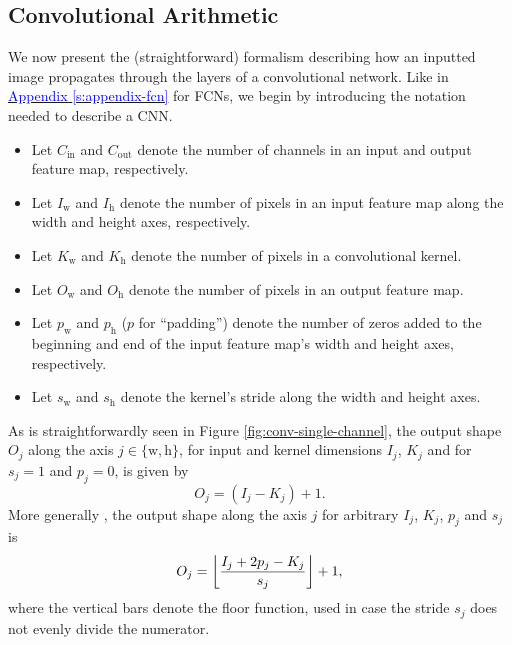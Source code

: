 \documentclass[11pt, a4paper]{article}
\newcommand{\myhref}[2]{\hyperref[#1]{\textcolor{blue}{#2}}}
\DeclarePairedDelimiter\floor{\lfloor}{\rfloor}  %
\begin{document}
\subsection{Convolutional Arithmetic} \label{ss:conv-arithmetic}
We now present the (straightforward) formalism describing how an inputted image propagates through the layers of a convolutional network. Like in \myhref{s:appendix-fcn}{Appendix \ref{s:appendix-fcn}} for FCNs, we begin by introducing the notation needed to describe a CNN.
\begin{itemize}

    \item Let $ C_{\text{in}} $ and $ C_{\text{out}} $ denote the number of channels in an input and output feature map, respectively.

    \item Let $ I_{\text{w}} $ and $ I_{\text{h}} $ denote the number of pixels in an input feature map along the width and height axes, respectively.

    \item Let $ K_{\text{w}} $ and $ K_{\text{h}} $ denote the number of pixels in a convolutional kernel. %

    \item Let $ O_{\text{w}} $ and $ O_{\text{h}} $ denote the number of pixels in an output feature map. %

    \item Let $ p_{\text{w}} $ and $ p_{\text{h}} $ ($ p $ for ``padding'') denote the number of zeros added to the beginning and end of the input feature map's width and height axes, respectively.

    \item Let $ s_{\text{w}} $ and $ s_{\text{h}} $ denote the kernel's stride along the width and height axes.

\end{itemize}
As is straightforwardly seen in Figure \ref{fig:conv-single-channel}, the output shape $ O_{j} $ along the axis $ j \in \{\text{w}, \text{h}\} $, for input and kernel dimensions $ I_{j} $, $ K_{j} $ and for $ s_{j} = 1 $ and $ p_{j} = 0 $, is given by
\begin{equation*}
    O_{j} = (I_{j} - K_{j}) + 1.
\end{equation*}
More generally \cite{cnn-guide}, the output shape along the axis $ j $ for arbitrary $ I_{j} $, $ K_{j} $, $ p_{j} $ and $ s_{j} $ is
\begin{equation}
    O_{j} = \floor*{\frac{I_{j} + 2p_{j} - K_{j}}{s_{j}}} + 1, \label{eq:cnn-O-conv}
\end{equation}
where the vertical bars denote the floor function, used in case the stride $ s_{j} $ does not evenly divide the numerator. 
\end{document}
